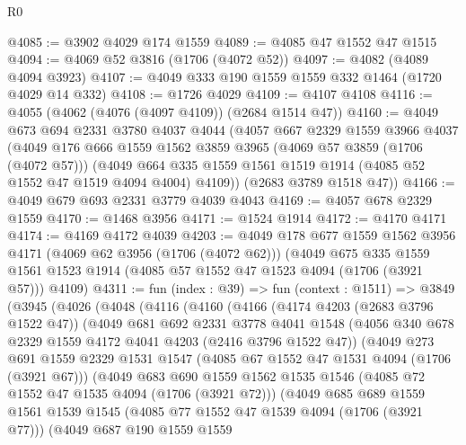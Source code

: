\begin{lexlean}{R0}
\begin{coremodule}
@4085 := @3902 @4029 @174 @1559
@4089 := @4085 @47 @1552 @47 @1515
@4094 := @4069 @52 @3816 (@1706 (@4072 @52))
@4097 := @4082 (@4089 @4094 @3923)
@4107 := @4049 @333 @190 @1559 @1559 @332 @1464 (@1720 @4029 @14 @332)
@4108 := @1726 @4029
@4109 := @4107 @4108
@4116 := @4055 (@4062 (@4076 (@4097 @4109)) (@2684 @1514 @47))
@4160 := @4049
    @673
    @694
    @2331
    @3780
    @4037
    @4044
    (@4057
      @667
      @2329
      @1559
      @3966
      @4037
      (@4049
        @176
        @666
        @1559
        @1562
        @3859
        @3965
        (@4069 @57 @3859 (@1706 (@4072 @57)))
        (@4049 @664 @335 @1559 @1561 @1519 @1914 (@4085 @52 @1552 @47 @1519 @4094 @4004) @4109))
      (@2683 @3789 @1518 @47))
@4166 := @4049 @679 @693 @2331 @3779 @4039 @4043
@4169 := @4057 @678 @2329 @1559
@4170 := @1468 @3956
@4171 := @1524 @1914
@4172 := @4170 @4171
@4174 := @4169 @4172 @4039
@4203 := @4049
    @178
    @677
    @1559
    @1562
    @3956
    @4171
    (@4069 @62 @3956 (@1706 (@4072 @62)))
    (@4049
      @675
      @335
      @1559
      @1561
      @1523
      @1914
      (@4085 @57 @1552 @47 @1523 @4094 (@1706 (@3921 @57)))
      @4109)
@4311 := fun (index : @39) =>
  fun (context : @1511) =>
  @3849
    (@3945
      (@4026
        (@4048
          (@4116
            (@4160
              (@4166
                (@4174 @4203 (@2683 @3796 @1522 @47))
                (@4049
                  @681
                  @692
                  @2331
                  @3778
                  @4041
                  @1548
                  (@4056 @340 @678 @2329 @1559 @4172 @4041 @4203 (@2416 @3796 @1522 @47))
                  (@4049
                    @273
                    @691
                    @1559
                    @2329
                    @1531
                    @1547
                    (@4085 @67 @1552 @47 @1531 @4094 (@1706 (@3921 @67)))
                    (@4049
                      @683
                      @690
                      @1559
                      @1562
                      @1535
                      @1546
                      (@4085 @72 @1552 @47 @1535 @4094 (@1706 (@3921 @72)))
                      (@4049
                        @685
                        @689
                        @1559
                        @1561
                        @1539
                        @1545
                        (@4085 @77 @1552 @47 @1539 @4094 (@1706 (@3921 @77)))
                        (@4049
                          @687
                          @190
                          @1559
                          @1559

\end{coremodule}
\end{lexlean}
